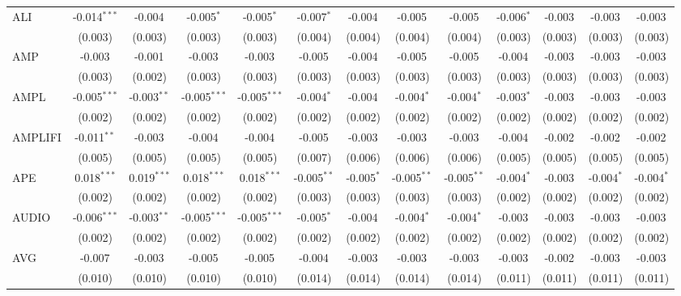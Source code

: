 \begin{table}[!htbp]
\begin{tabular}{@{\extracolsep{5pt}}lcccccccccccc}
 ALI & -0.014$^{***}$ & -0.004$^{}$ & -0.005$^{*}$ & -0.005$^{*}$ & -0.007$^{*}$ & -0.004$^{}$ & -0.005$^{}$ & -0.005$^{}$ & -0.006$^{*}$ & -0.003$^{}$ & -0.003$^{}$ & -0.003$^{}$ \\
  & (0.003) & (0.003) & (0.003) & (0.003) & (0.004) & (0.004) & (0.004) & (0.004) & (0.003) & (0.003) & (0.003) & (0.003) \\
 AMP & -0.003$^{}$ & -0.001$^{}$ & -0.003$^{}$ & -0.003$^{}$ & -0.005$^{}$ & -0.004$^{}$ & -0.005$^{}$ & -0.005$^{}$ & -0.004$^{}$ & -0.003$^{}$ & -0.003$^{}$ & -0.003$^{}$ \\
  & (0.003) & (0.002) & (0.003) & (0.003) & (0.003) & (0.003) & (0.003) & (0.003) & (0.003) & (0.003) & (0.003) & (0.003) \\
 AMPL & -0.005$^{***}$ & -0.003$^{**}$ & -0.005$^{***}$ & -0.005$^{***}$ & -0.004$^{*}$ & -0.004$^{}$ & -0.004$^{*}$ & -0.004$^{*}$ & -0.003$^{*}$ & -0.003$^{}$ & -0.003$^{}$ & -0.003$^{}$ \\
  & (0.002) & (0.002) & (0.002) & (0.002) & (0.002) & (0.002) & (0.002) & (0.002) & (0.002) & (0.002) & (0.002) & (0.002) \\
 AMPLIFI & -0.011$^{**}$ & -0.003$^{}$ & -0.004$^{}$ & -0.004$^{}$ & -0.005$^{}$ & -0.003$^{}$ & -0.003$^{}$ & -0.003$^{}$ & -0.004$^{}$ & -0.002$^{}$ & -0.002$^{}$ & -0.002$^{}$ \\
  & (0.005) & (0.005) & (0.005) & (0.005) & (0.007) & (0.006) & (0.006) & (0.006) & (0.005) & (0.005) & (0.005) & (0.005) \\
 APE & 0.018$^{***}$ & 0.019$^{***}$ & 0.018$^{***}$ & 0.018$^{***}$ & -0.005$^{**}$ & -0.005$^{*}$ & -0.005$^{**}$ & -0.005$^{**}$ & -0.004$^{*}$ & -0.003$^{}$ & -0.004$^{*}$ & -0.004$^{*}$ \\
  & (0.002) & (0.002) & (0.002) & (0.002) & (0.003) & (0.003) & (0.003) & (0.003) & (0.002) & (0.002) & (0.002) & (0.002) \\
 AUDIO & -0.006$^{***}$ & -0.003$^{**}$ & -0.005$^{***}$ & -0.005$^{***}$ & -0.005$^{*}$ & -0.004$^{}$ & -0.004$^{*}$ & -0.004$^{*}$ & -0.003$^{}$ & -0.003$^{}$ & -0.003$^{}$ & -0.003$^{}$ \\
  & (0.002) & (0.002) & (0.002) & (0.002) & (0.002) & (0.002) & (0.002) & (0.002) & (0.002) & (0.002) & (0.002) & (0.002) \\
 AVG & -0.007$^{}$ & -0.003$^{}$ & -0.005$^{}$ & -0.005$^{}$ & -0.004$^{}$ & -0.003$^{}$ & -0.003$^{}$ & -0.003$^{}$ & -0.003$^{}$ & -0.002$^{}$ & -0.003$^{}$ & -0.003$^{}$ \\
  & (0.010) & (0.010) & (0.010) & (0.010) & (0.014) & (0.014) & (0.014) & (0.014) & (0.011) & (0.011) & (0.011) & (0.011) \\

\end{tabular}
\end{table}
